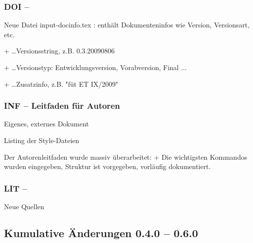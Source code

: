 \documentclass[ngerman,a4paper,fontsize=9pt,BCOR=0cm,DIV=11,headings=big,draft=no]{scrreprt}
\begin{document}
\subsubsection{DOI -- }

Neue Datei
          input-docinfo.tex : enthält Dokumenteninfos wie Version, Versionsart, etc.

+  \ldots Versionsstring, z.B.
                0.3.20090806

+  \ldots Versionstyp:
                Entwicklungsversion, Vorabversion, Final ...

+  \ldots Zusatzinfo, z.B.
                "füt ET IX/2009"

\subsubsection{INF -- Leitfaden für Autoren}

Eigenes, externes Dokument

Listing der Style-Dateien

Der Autorenleitfaden
          wurde massiv überarbeitet: + Die wichtigsten
          Kommandos wurden eingegeben, Struktur ist
          vorgegeben,  vorläufig dokumentiert.

\subsubsection{LIT -- }

Neue Quellen







\subsection{Kumulative Änderungen 0.4.0 -- 0.6.0}
\end{document}
